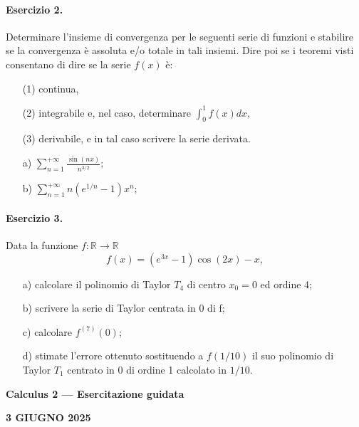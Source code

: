 \documentclass[a4paper, 10pt]{article}
\newcommand{\sectiontitle}[1]{\begin{center}\large\bfseries #1\end{center}}
\newcommand{\exercisecenter}[1]{\begin{center}\bfseries #1\end{center}}
\begin{document}
\paragraph{Esercizio 2.} Determinare l'insieme di convergenza per le seguenti serie di funzioni e stabilire se la convergenza è assoluta e/o totale in tali insiemi. Dire poi se i teoremi visti consentano di dire se la serie $f(x)$ è:
\begin{enumerate}
    \item[(1)] continua,
    \item[(2)] integrabile e, nel caso, determinare $\int_{0}^{1}f(x)dx$,
    \item[(3)] derivabile, e in tal caso scrivere la serie derivata.
\end{enumerate}
\begin{enumerate}
    \item[a)] $\displaystyle \sum_{n=1}^{+\infty}\frac{\sin(nx)}{n^{3/2}};$
    \item[b)] $\displaystyle \sum_{n=1}^{+\infty}n(e^{1/n}-1)x^{n};$
\end{enumerate}

\paragraph{Esercizio 3.} Data la funzione $f:\mathbb{R}\rightarrow\mathbb{R}$
\[ f(x)=(e^{3x}-1)\cos(2x)-x, \]
\begin{enumerate}
    \item[a)] calcolare il polinomio di Taylor $T_{4}$ di centro $x_{0}=0$ ed ordine 4;
    \item[b)] scrivere la serie di Taylor centrata in 0 di f;
    \item[c)] calcolare $f^{(7)}(0)$;
    \item[d)] stimate l'errore ottenuto sostituendo a $f(1/10)$ il suo polinomio di Taylor $T_{1}$ centrato in 0 di ordine 1 calcolato in $1/10$.
\end{enumerate}

\newpage

\sectiontitle{Calculus 2 --- Esercitazione guidata}
\exercisecenter{3 GIUGNO 2025}
\end{document}
